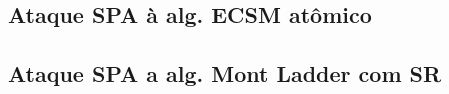 \begin{comment}  %
\subsubsection{Ataques baseados em templates}
\subsubsection{Ataques horizontais baseados em cross-correlation}
\subsubsection{Ataques horizontais não-supervisionados baseados em clustering}

\subsubsection{Aplicação de contramedidas em algoritmo esquerda para direita inseguro}
\subsubsection{Implementações de tempo constante}
\subsubsection{Implementações resistentes ao SPA}
\subsubsection{Impacto das contramedidas no desempenho}

\subsection{Eficácia de implementação de tempo constante}
\subsubsection{Outros métodos para inviabilizar ataques por tempo}
\end{comment}


\subsection{Ataque SPA à alg. ECSM atômico}

\subsection{Ataque SPA a alg. Mont Ladder com SR}

